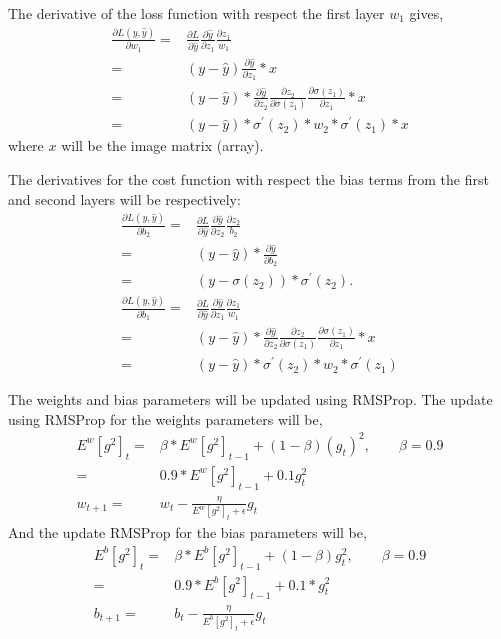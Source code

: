 \documentclass[12pt,a4paper]{article}
\begin{document}
\noindent The derivative of the loss function with respect the first layer $w_1$ gives,
\begin{align}
\frac{\partial L(y,\hat{y})}{\partial w_1}=&\frac{\partial L}{\partial \hat{y}}\frac{\partial\hat{y}}{\partial z_1}\frac{\partial z_1}{w_1}\\
=&(y-\hat{y})\frac{\partial\hat{y}}{\partial z_1}*x\\
=&(y-\hat{y})*\frac{\partial \hat{y}}{\partial z_2}\frac{\partial z_2}{\partial\sigma(z_1)}\frac{\partial\sigma(z_1)}{\partial z_1}*x\\
=&(y-\hat{y})*\sigma^{\prime}(z_2)*w_2*\sigma^{\prime}(z_1)*x
\end{align}
\noindent where $x$ will be the image matrix (array).

\noindent The derivatives for the cost function with respect the bias terms from the first and second layers will be respectively:
\begin{align}
\frac{\partial L(y,\hat{y})}{\partial b_2}=&\frac{\partial L}{\partial \hat{y}}\frac{\partial\hat{y}}{\partial z_2}\frac{\partial z_2}{b_2}\\
=&(y-\hat{y})*\frac{\partial\hat{y}}{\partial b_2}\\
=&(y-\sigma(z_2))*\sigma^\prime(z_2).\\
\frac{\partial L(y,\hat{y})}{\partial b_1}=&\frac{\partial L}{\partial \hat{y}}\frac{\partial\hat{y}}{\partial z_1}\frac{\partial z_1}{w_1}\\
=&(y-\hat{y})*\frac{\partial \hat{y}}{\partial z_2}\frac{\partial z_2}{\partial\sigma(z_1)}\frac{\partial\sigma(z_1)}{\partial z_1}*x\\
=&(y-\hat{y})*\sigma^{\prime}(z_2)*w_2*\sigma^{\prime}(z_1)
\end{align}

\noindent The weights and bias parameters will be updated using RMSProp. The update using RMSProp for the weights parameters will be,
\begin{align}
E^w[g^2]_t=&\beta *E^w[g^2]_{t-1}+(1-\beta)(g_t)^2,\quad\quad\beta =0.9\\
=&0.9*E^w[g^2]_{t-1}+0.1g_t^2\\
w_{t+1}=&w_t-\frac{\eta}{E^w[g^2]_t+\epsilon}g_t
\end{align}
\noindent And the update RMSProp for the bias parameters will be,
\begin{align}
E^b[g^2]_t=& \beta *E^b[g^2]_{t-1}+(1-\beta)g_t^2,\quad\quad\beta =0.9\\
=& 0.9 *E^b[g^2]_{t-1}+0.1*g_t^2\\
b_{t+1}=&b_t-\frac{\eta}{E^b[g^2]_t+\epsilon}g_t
\end{align}
\end{document}
